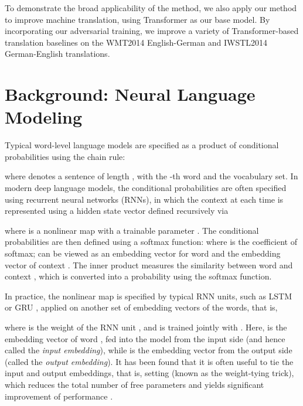\documentclass{article}
\begin{document}
To demonstrate the broad applicability of the method, 
we also apply our method to improve machine translation, using 
Transformer \citep{vaswani2017attention} as our base model. 
By incorporating our adversarial training,  
we improve a variety of Transformer-based translation baselines on the WMT2014 English-German and IWSTL2014 German-English translations.








 
\section{Background: Neural Language Modeling}
Typical word-level language models are specified as a product of conditional probabilities using the chain rule: 

where  denotes a sentence of length , with 
 the -th word and  the 
vocabulary set. 
In modern deep language models, the conditional probabilities   are often specified using recurrent neural networks (RNNs), 
in which  the context  
at each time  is represented 
using a hidden state vector  defined recursively via 

where  is a nonlinear map with a trainable parameter . 
The conditional probabilities are then defined using a softmax function: 
where  is the coefficient of softmax;  
 can be viewed as an embedding vector for word 
and  the embedding vector of context .  
The inner product  measures the similarity between word  and context , which is converted into a probability using the softmax function. 

In practice, the nonlinear map  is specified by typical RNN units, 
such as LSTM \citep{hochreiter1997long} or GRU \citep{chung2014empirical}, 
applied on another set of embedding vectors  of the words, 
that is, 

where  is the weight of the RNN unit , 
and   is trained jointly with . 
Here,  is the embedding vector of word , fed into the model from the input side (and hence called the \emph{input embedding}), while  is the embedding vector from the output side (called the \emph{output embedding}). 
It has been found that it is often useful to tie the input and output embeddings, that is, setting  (known as the weight-tying trick), 
which reduces the total number of free parameters and yields significant improvement of performance   \citep[e.g.,][]{press2016using, inan2016tying}. 
\end{document}
